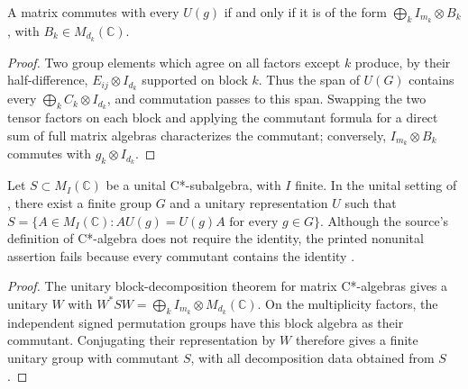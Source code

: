 \begin{lemma}%
    \label{thm:peps_block_signed_permutation_commutant}
    \leanok
    A matrix commutes with every $U(g)$ if and only if it is of the form
    $\bigoplus_k I_{m_k}\otimes B_k$, with $B_k\in M_{d_k}(\mathbb C)$.
\end{lemma}

\begin{proof}\leanok
    Two group elements which agree on all factors except $k$ produce,
    by their half-difference, $E_{ij}\otimes I_{d_k}$ supported on block $k$.
    Thus the span of $U(G)$ contains every
    $\bigoplus_k C_k\otimes I_{d_k}$, and commutation passes to this span.
    Swapping the two tensor factors on each block and applying the commutant
    formula for a direct sum of full matrix algebras characterizes the commutant;
    conversely, $I_{m_k}\otimes B_k$ commutes with $g_k\otimes I_{d_k}$.
\end{proof}

\begin{lemma}%
    \label{thm:peps_finite_group_commutant_unital}
    \leanok
    Let $S\subset M_I(\mathbb C)$ be a unital C*-subalgebra, with $I$ finite.
    In the unital setting of \cite[Theorem~4.1]{Schuch2010PEPS},
    there exist a finite group $G$ and a unitary representation $U$ such that
    $S=\{A\in M_I(\mathbb C): AU(g)=U(g)A\text{ for every }g\in G\}$.
    Although the source's definition of C*-algebra does not require the identity,
    the printed nonunital assertion fails because every commutant contains
    the identity \cite{gap:scp10_finite_group_commutant_unital}.
\end{lemma}

\begin{proof}\leanok
    The unitary block-decomposition theorem for matrix C*-algebras
    \cite[Theorem~6.14]{Wolf2012Quantum} gives a unitary $W$ with
    $W^*SW=\bigoplus_k I_{m_k}\otimes M_{d_k}(\mathbb C)$.
    On the multiplicity factors, the independent signed permutation groups
    have this block algebra as their commutant. Conjugating their
    representation by $W$ therefore gives a finite unitary group with
    commutant $S$, with all decomposition data obtained from $S$.
\end{proof}
